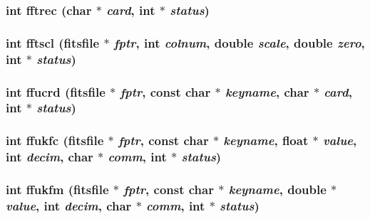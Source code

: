 \subsubsection{\setlength{\rightskip}{0pt plus 5cm}int fftrec (char $\ast$ {\em card}, int $\ast$ {\em status})}\label{src_2fitsio_8h_790ab8b814352c996191e4eed875c843}


\subsubsection{\setlength{\rightskip}{0pt plus 5cm}int fftscl (\bf{fitsfile} $\ast$ {\em fptr}, int {\em colnum}, double {\em scale}, double {\em zero}, int $\ast$ {\em status})}\label{src_2fitsio_8h_189576cb1cc68cb3339679ea81efa79e}


\subsubsection{\setlength{\rightskip}{0pt plus 5cm}int ffucrd (\bf{fitsfile} $\ast$ {\em fptr}, const char $\ast$ {\em keyname}, char $\ast$ {\em card}, int $\ast$ {\em status})}\label{src_2fitsio_8h_e18c3770ab750f65ed969ed243adc779}


\subsubsection{\setlength{\rightskip}{0pt plus 5cm}int ffukfc (\bf{fitsfile} $\ast$ {\em fptr}, const char $\ast$ {\em keyname}, float $\ast$ {\em value}, int {\em decim}, char $\ast$ {\em comm}, int $\ast$ {\em status})}\label{src_2fitsio_8h_a327f0515451f35b7ed8e6c31bc92421}


\subsubsection{\setlength{\rightskip}{0pt plus 5cm}int ffukfm (\bf{fitsfile} $\ast$ {\em fptr}, const char $\ast$ {\em keyname}, double $\ast$ {\em value}, int {\em decim}, char $\ast$ {\em comm}, int $\ast$ {\em status})}\label{src_2fitsio_8h_c26ad2e4d827639f834233229cf99ccb}


